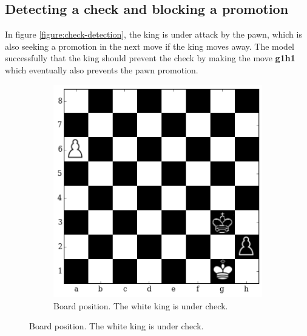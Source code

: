 \subsection{Detecting a check and blocking a promotion}
In figure \ref{figure:check-detection}, the king is under attack by the pawn, 
which is also seeking a promotion in the next move if the king moves away. The 
model successfully that the king should prevent the check by making the 
move \textbf{g1h1} which eventually also prevents the pawn promotion.

\begin{figure}[H]
\hspace*{-0.5in}  
  \centering
    \begin{subfigure}[t]{\textwidth}
        \centering
        \includegraphics[scale=0.65]{img/best_moves/output_24_0.png}
        \caption{Board position. The white king is under check.}
    \end{subfigure}%


\end{figure}
